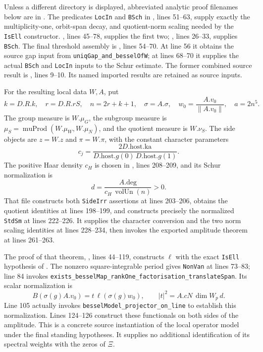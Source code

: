 Unless a different directory is displayed, abbreviated analytic proof
filenames below are in
.
The predicates \texttt{LocIn} and \texttt{BSch} in
,
lines 51--63, supply exactly the multiplicity-one, orbit-span decay,
and quotient-norm scaling needed by the \texttt{IsEll} constructor.
, lines 45--78,
supplies the first two; , lines 26--33,
supplies \texttt{BSch}.  The final threshold assembly is
,
lines 54--70.  At line 56 it obtains the source gap input from
\texttt{uniqGap\_and\_besselOfW}; at lines 68--70 it supplies the
actual \texttt{BSch} and \texttt{LocIn} inputs to the Schur estimate.
The former combined source result is
, lines 9--10.
Its named imported results are retained as source inputs.

For the resulting local data \(W,A\), put
\[
 k=D.R.k,\quad r=D.R.rS,\quad n=2r+k+1,\quad
 \sigma=A.\sigma,\quad w_0=\frac{A.v_0}{\|A.v_0\|},\quad a=2n^5.
\]
The group measure is \(W.\mu_G\), the subgroup measure is
\(\mu_S=\operatorname{muProd}(W.\mu_W,W.\mu_N)\), and the quotient
measure is \(W.\nu_S\).  The side objects are \(z=W.z\) and
\(\pi=W.\pi\), with the constant character parameters
\[
 c_j=\frac{2D.\mathrm{host}.\mathrm{ka}}
 {D.\mathrm{host}.g(0)\,D.\mathrm{host}.g(1)}.
\]
The positive Haar density \(c_H\) is chosen in
, lines 208--209, and its Schur
normalization is
\[
 d=\frac{A.\mathrm{deg}}{c_H\,\operatorname{volUn}(n)}>0.
\]
That file constructs both \texttt{SideIrr} assertions at lines
203--206, obtains the quotient identities at lines 198--199,
and constructs precisely the normalized \texttt{StdSm} at lines
222--226.  It supplies the character conversion and the two norm
scaling identities at lines 228--234, then invokes the exported
amplitude theorem at lines 261--263.

The proof of that theorem,
,
lines 44--119, constructs \(\ell\) with the exact
\texttt{IsEll} hypothesis of .
The nonzero square-integrable period gives \texttt{NonVan} at
lines 73--83; line 84 invokes
\texttt{exists\_besselMap\_rankOne\_factorisation\_translateSpan}.
Its scalar normalization is
\[
 B(\sigma(g)A.v_0)=t\,\ell(\sigma(g)w_0),\qquad
 |t|^2=A.cN\,\dim W_p\,d.
\]
Line 105 actually invokes
\texttt{besselModel\_projector\_on\_line} to establish this
normalization.  Lines 124--126 construct these functionals on
both sides of the amplitude.  This is a concrete source
instantiation of the local operator model under the final standing
hypotheses.  It supplies no additional identification of its
spectral weights with the zeros of \(\Xi\).

